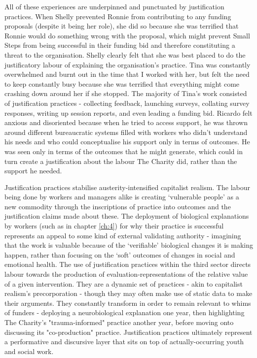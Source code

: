 All of these experiences are underpinned and punctuated by justification practices. When Shelly prevented Ronnie from contributing to any funding proposals (despite it being her role), she did so because she was terrified that Ronnie would do something wrong with the proposal,  which might prevent Small Steps from being successful in their funding bid and therefore constituting a threat to the organisation. Shelly clearly felt that she was best placed to do the justificatory labour of explaining the organisation's practice. Tina was constantly overwhelmed and burnt out in the time that I worked with her, but felt the need to keep constantly busy because she was terrified that everything might come crashing down around her if she stopped. The majority of Tina's work consisted of justification practices - collecting feedback, launching surveys, collating survey responses, writing up session reports, and even leading a funding bid. Ricardo felt anxious and disoriented because when he tried to access support, he was thrown around different bureaucratic systems filled with workers who didn't understand his needs and who could conceptualise his support only in terms of outcomes. He was seen only in terms of the outcomes that he might generate, which could in turn create a justification about the labour The Charity did, rather than the support he needed.

Justification practices stabilise austerity-intensified capitalist realism. The labour being done by workers and managers alike is creating `vulnerable people' as a new commodity through the inscriptions of practice into outcomes and the justification claims made about these. The deployment of biological explanations by workers (such as in chapter \ref{ch:4}) for why their practice is successful represents an appeal to some kind of external validating authority - imagining that the work is valuable because of the `verifiable' biological changes it is making happen, rather than focusing on the `soft' outcomes of changes in social and emotional health. The use of justification practices within the third sector directs labour towards the production of evaluation-representations of the relative value of a given intervention. They are a dynamic set of practices - akin to capitalist realism's precorporation - though they may often make use of static data to make their arguments. They constantly transform in order to remain relevant to whims of funders - deploying a neurobiological explanation one year, then highlighting The Charity's "trauma-informed" practice another year, before moving onto discussing its "co-production" practice. Justification practices ultimately represent a performative and discursive layer that sits on top of actually-occurring youth and social work.

